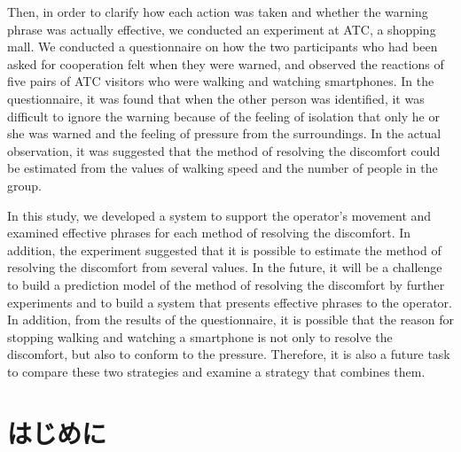 \documentclass{kuisthesis}
\begin{document}
\begin{eabstract}
Then, in order to clarify how each action was taken and whether the warning phrase was actually effective, we conducted an experiment at ATC, a shopping mall. We conducted a questionnaire on how the two participants who had been asked for cooperation felt when they were warned, and observed the reactions of five pairs of ATC visitors who were walking and watching smartphones. In the questionnaire, it was found that when the other person was identified, it was difficult to ignore the warning because of the feeling of isolation that only he or she was warned and the feeling of pressure from the surroundings. In the actual observation, it was suggested that the method of resolving the discomfort could be estimated from the values of walking speed and the number of people in the group.

In this study, we developed a system to support the operator's movement and examined effective phrases for each method of resolving the discomfort. In addition, the experiment suggested that it is possible to estimate the method of resolving the discomfort from several values. In the future, it will be a challenge to build a prediction model of the method of resolving the discomfort by further experiments and to build a system that presents effective phrases to the operator.
In addition, from the results of the questionnaire, it is possible that the reason for stopping walking and watching a smartphone is not only to resolve the discomfort, but also to conform to the pressure.
Therefore, it is also a future task to compare these two strategies and examine a strategy that combines them.
\end{eabstract}

\tableofcontents



\section{はじめに} %
\end{document}
